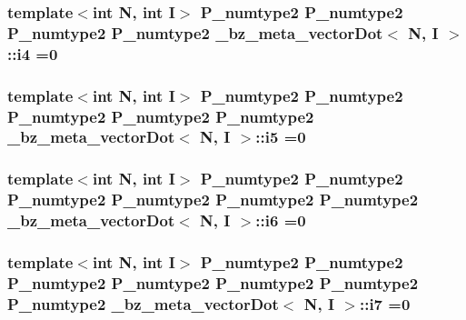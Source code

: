 \subsubsection[{i4}]{\setlength{\rightskip}{0pt plus 5cm}template$<$int N, int I$>$ P\+\_\+numtype2 P\+\_\+numtype2 P\+\_\+numtype2 P\+\_\+numtype2 {\bf \+\_\+bz\+\_\+meta\+\_\+vector\+Dot}$<$ {\bf N}, I $>$\+::i4 =0}\label{class__bz__meta__vectorDot_a0640208203def938760605ff450daab7}
\hypertarget{class__bz__meta__vectorDot_aea440a95407cd653fbaed1765a4dcd2f}{}
\subsubsection[{i5}]{\setlength{\rightskip}{0pt plus 5cm}template$<$int N, int I$>$ P\+\_\+numtype2 P\+\_\+numtype2 P\+\_\+numtype2 P\+\_\+numtype2 P\+\_\+numtype2 {\bf \+\_\+bz\+\_\+meta\+\_\+vector\+Dot}$<$ {\bf N}, I $>$\+::i5 =0}\label{class__bz__meta__vectorDot_aea440a95407cd653fbaed1765a4dcd2f}
\hypertarget{class__bz__meta__vectorDot_a11e7bc093533e67c133b2d60e749d2a0}{}
\subsubsection[{i6}]{\setlength{\rightskip}{0pt plus 5cm}template$<$int N, int I$>$ P\+\_\+numtype2 P\+\_\+numtype2 P\+\_\+numtype2 P\+\_\+numtype2 P\+\_\+numtype2 P\+\_\+numtype2 {\bf \+\_\+bz\+\_\+meta\+\_\+vector\+Dot}$<$ {\bf N}, I $>$\+::i6 =0}\label{class__bz__meta__vectorDot_a11e7bc093533e67c133b2d60e749d2a0}
\hypertarget{class__bz__meta__vectorDot_a30efdfcb5e446025d7ac16cd30c801d6}{}
\subsubsection[{i7}]{\setlength{\rightskip}{0pt plus 5cm}template$<$int N, int I$>$ P\+\_\+numtype2 P\+\_\+numtype2 P\+\_\+numtype2 P\+\_\+numtype2 P\+\_\+numtype2 P\+\_\+numtype2 P\+\_\+numtype2 {\bf \+\_\+bz\+\_\+meta\+\_\+vector\+Dot}$<$ {\bf N}, I $>$\+::i7 =0}\label{class__bz__meta__vectorDot_a30efdfcb5e446025d7ac16cd30c801d6}
\hypertarget{class__bz__meta__vectorDot_a55f15e8fefa216f49bd5119b0af133ed}{}
